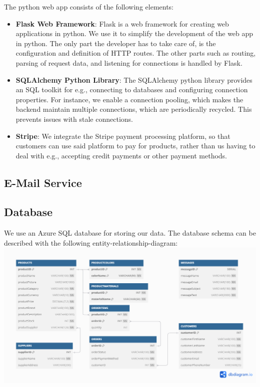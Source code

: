 The python web app consists of the following elements:

\begin{itemize}
    \item \textbf{Flask Web Framework}: Flask is a web framework for creating web applications in python.
    We use it to simplify the development of the web app in python.
    The only part the developer has to take care of, is the configuration and definition of HTTP routes.
    The other parts such as routing, parsing of request data, and listening for connections is handled by Flask.
    \item \textbf{SQLAlchemy Python Library}: The SQLAlchemy python library provides an SQL toolkit for e.g., 
    connecting to databases and configuring connection properties.
    For instance, we enable a connection pooling, which makes the backend maintain multiple connections,
    which are periodically recycled. This prevents issues with stale connections.
    \item \textbf{Stripe}: We integrate the Stripe payment processing platform, so that customers can use said platform
    to pay for products, rather than us having to deal with e.g., 
    accepting credit payments or other payment methods.
\end{itemize}

\subsection{E-Mail Service}

\subsection{Database}
We use an Azure SQL database for storing our data.
The database schema can be described with the following
entity-relationship-diagram:
\includegraphics{images/db_er_diagram.png}

